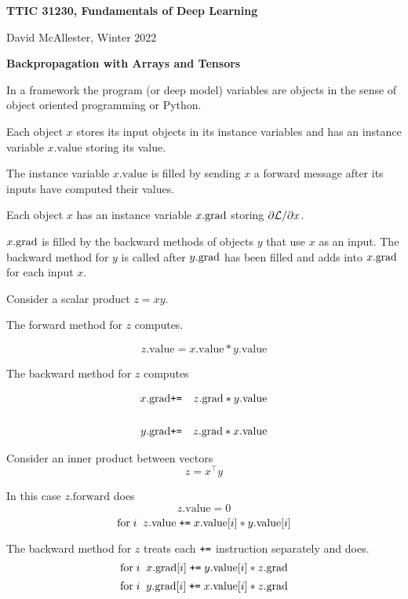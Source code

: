 




{\Huge
  
  \centerline{\bf TTIC 31230, Fundamentals of Deep Learning}
  \bigskip
  \centerline{David McAllester, Winter 2022}
  \vfill
  \vfill
  \centerline{\bf Backpropagation with Arrays and Tensors}
  \vfill
  \vfill



\vfill
In a framework the program (or deep model) variables are objects in the sense of object oriented programming or Python.

\vfill
Each object $x$ stores its input objects in its instance variables and has an instance variable $x.\mathrm{value}$ storing its value.

\vfill
The instance variable $x.\mathrm{value}$ is filled by sending $x$ a forward message after its inputs have computed their values.

\vfill
{\color{red} Each object $x$ has an instance variable $x.\mathrm{grad}$ storing $\partial {\cal L}/\partial x$.}

\vfill
$x.\mathrm{grad}$ is filled by the backward methods of objects $y$ that
use $x$ as an input.  The backward method for $y$ is called after $y.\mathrm{grad}$ has been filled and adds into $x.\mathrm{grad}$ for each input $x$.


Consider a scalar product $z = xy$.

\vfill
The forward method for $z$ computes.

$$z.\mathrm{value} = x.\mathrm{value}*y.\mathrm{value}$$

\vfill
The backward method for $z$ computes

\begin{eqnarray*}
x.\mathrm{grad} & \mbox{\tt +=} & z.\mathrm{grad} * y.\mathrm{value} \\
\\
y.\mathrm{grad} & \mbox{\tt +=} & z.\mathrm{grad} * x.\mathrm{value}
\end{eqnarray*}


Consider an inner product between vectors
$$z = x^\top y$$

\vfill
In this case $z.\mathrm{forward}$ does
$$z.\mathrm{value} = 0$$
$$\mathrm{for}\;i\;\;z.\mathrm{value} \;\mbox{\tt +=}\;x.\mathrm{value}[i]*y.\mathrm{value}[i]$$

\vfill
The backward method for $z$  treats each $\mbox{\tt +=}$ instruction separately and does.
$$\mathrm{for}\;i\;\;x.\mathrm{grad}[i] \;\mbox{\tt +=}\;y.\mathrm{value}[i]*z.\mathrm{grad}$$
$$\mathrm{for}\;i\;\;y.\mathrm{grad}[i] \;\mbox{\tt +=}\;x.\mathrm{value}[i]*z.\mathrm{grad}$$

}

